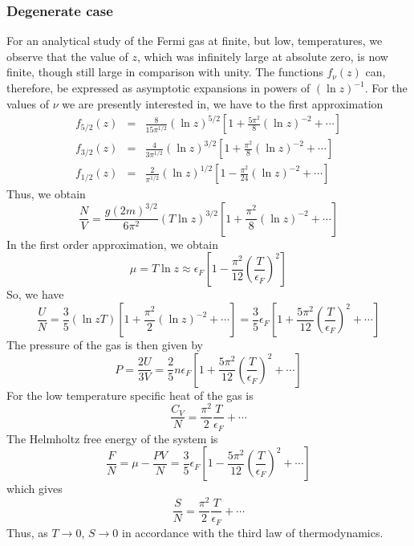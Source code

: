 \documentclass[cyan]{elegantnote}
\begin{document}
\subsubsection{Degenerate case}
For an analytical study of the Fermi gas at finite, but low, temperatures, we observe that the value of $z$, which was infinitely large at absolute zero, is now finite, though still large in comparison with unity. 
The functions $f_{\nu}(z)$ can, therefore, be expressed as asymptotic expansions in powers of $(\ln z)^{-1}$.
For the values of $\nu$ we are presently interested in, we have to the first approximation
\begin{eqnarray}
f_{5/2}(z) &=& \frac{8}{15\pi^{1/2}} (\ln z)^{5/2} \left[ 1 + \frac{5\pi^2}{8}(\ln z)^{-2} + \cdots \right] \nonumber \\
f_{3/2}(z) &=& \frac{4}{3\pi^{1/2}} (\ln z)^{3/2} \left[ 1 + \frac{\pi^2}{8}(\ln z)^{-2} + \cdots \right] \nonumber \\
f_{1/2}(z) &=& \frac{2}{\pi^{1/2}} (\ln z)^{1/2} \left[ 1 - \frac{\pi^2}{24}(\ln z)^{-2} + \cdots \right] \nonumber
\end{eqnarray}
Thus, we obtain
\[\frac{N}{V} = \frac{g(2m)^{3/2}}{6\pi^2} (T\ln z)^{3/2} \left[ 1 + \frac{\pi^2}{8}(\ln z)^{-2} + \cdots \right] \]
In the first order approximation, we obtain
\[\mu = T\ln z \approx \epsilon_F \left[ 1 - \frac{\pi^2}{12} \left( \frac{T}{\epsilon_F} \right)^2 \right]\]
So, we have
\[\frac{U}{N} = \frac{3}{5} (\ln z T) \left[ 1 + \frac{\pi^2}{2}(\ln z)^{-2} + \cdots \right] = \frac{3}{5}\epsilon_F \left[ 1 + \frac{5\pi^2}{12}\left( \frac{T}{\epsilon_F} \right)^2 + \cdots \right]\]
The pressure of the gas is then given by
\[P = \frac{2U}{3V} = \frac{2}{5}n\epsilon_F\left[ 1 + \frac{5\pi^2}{12}\left( \frac{T}{\epsilon_F} \right)^2 + \cdots \right] \]
For the low temperature specific heat of the gas is
\[\frac{C_V}{N} = \frac{\pi^2}{2} \frac{T}{\epsilon_F} + \cdots\]
The Helmholtz free energy of the system is
\[\frac{F}{N} = \mu - \frac{PV}{N} = \frac{3}{5}\epsilon_F\left[ 1 - \frac{5\pi^2}{12}\left( \frac{T}{\epsilon_F} \right)^2 + \cdots \right] \]
which gives
\[\frac{S}{N} = \frac{\pi^2}{2}\frac{T}{\epsilon_F} + \cdots\]
Thus, as $T \to 0$, $S \to 0$ in accordance with the third law of thermodynamics.
\end{document}
